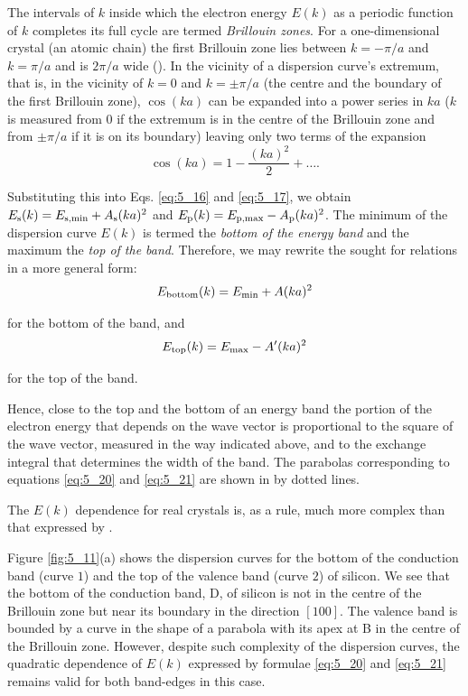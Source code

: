 The intervals of $k$ inside which the electron energy $E(k)$ as a periodic function of $k$ completes its full cycle are termed \textit{Brillouin zones}. For a one-dimensional crystal (an atomic chain) the first Brillouin zone lies between $k=-\pi/a$ and $k=\pi/a$ and is $2\pi/a$ wide (). In the vicinity of a dispersion curve's extremum, that is, in the vicinity of $k=0$ and $k=\pm\pi/a$ (the centre and the boundary of the first Brillouin zone), $\cos(ka)$ can be expanded into a power series in $ka$ ($k$ is measured from $0$ if the extremum is in the centre of the Brillouin zone and from $\pm\pi/a$ if it is on its boundary) leaving only two terms of the expansion
\begin{equation*}
    \cos(ka) = 1 - \frac{(ka)^2}{2} + \ldots.
\end{equation*}

\noindent
Substituting this into Eqs. \eqref{eq:5_16} and \eqref{eq:5_17}, we obtain $E_{\text{s}}(k)=E_{\text{s,min}}+A_{\text{s}}(ka)^2$ and $E_{\text{p}}(k)=E_{\text{p,max}}-A_{\text{p}}(ka)^2$.
The minimum of the dispersion curve $E(k)$ is termed the \textit{bottom of the energy band} and the maximum the \textit{top of the band}. Therefore, we may rewrite the sought for relations in a more general form:
\begin{equation}\label{eq:5_20}
    E_{\text{bottom}}(k) = E_{\text{min}} + A (ka)^2
\end{equation}

\noindent
for the bottom of the band, and
\begin{equation}\label{eq:5_21}
    E_{\text{top}}(k) = E_{\text{max}} - A' (ka)^2
\end{equation}

\noindent
for the top of the band.

Hence, close to the top and the bottom of an energy band the portion of the electron energy that depends on the wave vector is proportional to the square of the wave vector, measured in the way indicated above, and to the exchange integral that determines the width of the band. The parabolas corresponding to equations \eqref{eq:5_20} and \eqref{eq:5_21} are shown in  by dotted lines.

The $E(k)$ dependence for real crystals is, as a rule, much more complex than that expressed by .

Figure \ref{fig:5_11}(a) shows the dispersion curves for the bottom of the conduction band (curve $1$) and the top of the valence band (curve $2$) of silicon. We see that the bottom of the conduction band, D, of silicon is not in the centre of the Brillouin zone but near its boundary in the direction $[100]$. The valence band is bounded by a curve in the shape of a parabola with its apex at B in the centre of the Brillouin zone. However, despite such complexity of the dispersion curves, the quadratic dependence of $E(k)$ expressed by formulae \eqref{eq:5_20} and \eqref{eq:5_21} remains valid for both band-edges in this case.

